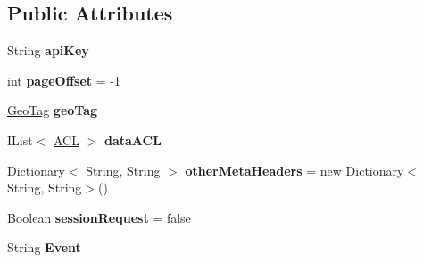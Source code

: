 \subsection*{Public Attributes}
\begin{DoxyCompactItemize}
\item 
\hypertarget{classcom_1_1shephertz_1_1app42_1_1paas_1_1sdk_1_1windows_1_1_app42_service_abd393785430644659edcd3cbb8f6928f}{String {\bfseries api\+Key}}\label{classcom_1_1shephertz_1_1app42_1_1paas_1_1sdk_1_1windows_1_1_app42_service_abd393785430644659edcd3cbb8f6928f}

\item 
\hypertarget{classcom_1_1shephertz_1_1app42_1_1paas_1_1sdk_1_1windows_1_1_app42_service_a0eca7198905bdc23a69a3ea98a36ff1c}{int {\bfseries page\+Offset} = -\/1}\label{classcom_1_1shephertz_1_1app42_1_1paas_1_1sdk_1_1windows_1_1_app42_service_a0eca7198905bdc23a69a3ea98a36ff1c}

\item 
\hypertarget{classcom_1_1shephertz_1_1app42_1_1paas_1_1sdk_1_1windows_1_1_app42_service_a56d1fcf2f6d233c070f7245a1f863136}{\hyperlink{classcom_1_1shephertz_1_1app42_1_1paas_1_1sdk_1_1windows_1_1storage_1_1_geo_tag}{Geo\+Tag} {\bfseries geo\+Tag}}\label{classcom_1_1shephertz_1_1app42_1_1paas_1_1sdk_1_1windows_1_1_app42_service_a56d1fcf2f6d233c070f7245a1f863136}

\item 
\hypertarget{classcom_1_1shephertz_1_1app42_1_1paas_1_1sdk_1_1windows_1_1_app42_service_ae12a8b79edc6dba9475dafa7d46a0fee}{I\+List$<$ \hyperlink{classcom_1_1shephertz_1_1app42_1_1paas_1_1sdk_1_1windows_1_1_a_c_l}{A\+C\+L} $>$ {\bfseries data\+A\+C\+L}}\label{classcom_1_1shephertz_1_1app42_1_1paas_1_1sdk_1_1windows_1_1_app42_service_ae12a8b79edc6dba9475dafa7d46a0fee}

\item 
\hypertarget{classcom_1_1shephertz_1_1app42_1_1paas_1_1sdk_1_1windows_1_1_app42_service_ab2f3bc9d6c62a98ba0ca1f6c62963258}{Dictionary$<$ String, String $>$ {\bfseries other\+Meta\+Headers} = new Dictionary$<$String, String$>$()}\label{classcom_1_1shephertz_1_1app42_1_1paas_1_1sdk_1_1windows_1_1_app42_service_ab2f3bc9d6c62a98ba0ca1f6c62963258}

\item 
\hypertarget{classcom_1_1shephertz_1_1app42_1_1paas_1_1sdk_1_1windows_1_1_app42_service_a3a7f3d42528512ffd6a17b72e2f0a597}{Boolean {\bfseries session\+Request} = false}\label{classcom_1_1shephertz_1_1app42_1_1paas_1_1sdk_1_1windows_1_1_app42_service_a3a7f3d42528512ffd6a17b72e2f0a597}

\item 
\hypertarget{classcom_1_1shephertz_1_1app42_1_1paas_1_1sdk_1_1windows_1_1_app42_service_a25549cdc9e8e2338f9bb11460fb945af}{String {\bfseries Event}}\label{classcom_1_1shephertz_1_1app42_1_1paas_1_1sdk_1_1windows_1_1_app42_service_a25549cdc9e8e2338f9bb11460fb945af}

\end{DoxyCompactItemize}
